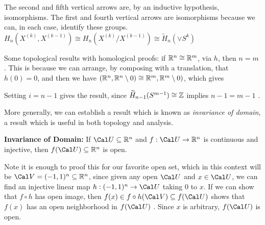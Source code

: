 
\ssk

The second and fifth vertical arrows are, by an inductive hypothesis, isomorphisms. The first and fourth vertical arrows are
isomorphisms because we can, in each case, identify these groups. 
$H_{n}(X^{(k)},X^{(k-1)})\cong H_{n}(X^{(k)}/X^{(k-1)})\cong \widetilde{H}_n(\vee S^k)$




\bigskip

Some topological results with homological proofs: if ${\Bbb R}^n\cong {\Bbb R}^m$, via $h$, then $n=m$ .
This is because we can arrange, by composing with a translation, that $h(0)=0$, and then 
we have 
$({\Bbb R}^n,{\Bbb R}^n\setminus 0)\cong {\Bbb R}^m,{\Bbb R}^m\setminus 0)$, which gives


\ssk



\ssk

Setting $i=n-1$ gives the result, since $\widetilde{H}_{n-1}(S^{m-1})\cong {\Bbb Z}$ implies $n-1=m-1$ .

\msk

More generally, we can establish a result which is known as {\it invariance of domain},
a result which is useful in both topology and analysis.

\msk

{\bf Invariance of Domain:} If ${\Cal U}\subseteq {\Bbb R}^n$ and $f:{\Cal U}\ra {\Bbb R}^n$
is continuous and injective, then $f({\Cal U})\subseteq {\Bbb R}^n$ is open.

\msk

Note it is enough to proof this for our favorite open set, which in this context will be ${\Cal V}=(-1,1)^n\subseteq {\Bbb R}^n$,
since given any open ${\Cal U}$ and $x\in{\Cal U}$, we can find an injective linear map $h:(-1,1)^n\ra {\Cal U}$
taking $0$ to $x$. If we can show that $f\circ h$ has open image, then $f(x)\in f\circ h({\Cal V})\subseteq f({\Cal U})$
shows that $f(x)$ has an open neighborhood in $f({\Cal U})$ . Since $x$ is arbitrary, $f({\Cal U})$ is open.

